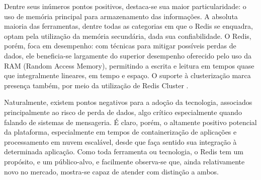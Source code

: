 \documentclass[12pt]{article}
\begin{document}
Dentre seus inúmeros pontos positivos, destaca-se sua maior particularidade: o uso de memória principal para armazenamento das informações. A absoluta maioria das ferramentas, dentre todas as categorias em que o Redis se enquadra, optam pela utilização da memória secundária, dada sua confiabilidade. O Redis, porém, foca em desempenho: com técnicas para mitigar possíveis perdas de dados, ele beneficia-se largamente do superior desempenho oferecido pelo uso da RAM (Random Access Memory), permitindo a escrita e leitura em tempos quase que integralmente lineares, em tempo e espaço. O suporte à clusterização marca presença também, por meio da utilização de Redis Cluster \cite{li:17}.

Naturalmente, existem pontos negativos para a adoção da tecnologia, associados principalmente ao risco de perda de dados, algo crítico especialmente quando falando de sistemas de mensageria. É claro, porém, o altamente positivo potencial da plataforma, especialmente em tempos de containerização de aplicações e processamento em nuvem escalável, desde que faça sentido sua integração à determinada aplicação. Como toda ferramenta ou tecnologia, o Redis tem um propósito, e um público-alvo, e facilmente observa-se que, ainda relativamente novo no mercado, mostra-se capaz de atender com distinção a ambos.



\end{document}
